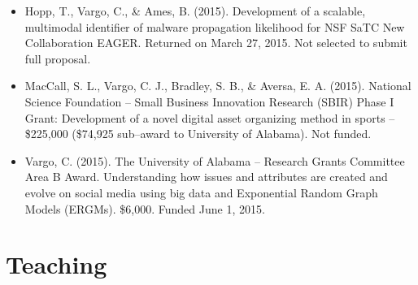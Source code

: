 \documentclass[11pt,letterpaper]{article}
\begin{document}
{\begin{itemize}
\item Hopp, T., Vargo, C., \& Ames, B. (2015). Development of a scalable, multimodal identifier of malware propagation likelihood for NSF SaTC New Collaboration EAGER. Returned on March 27, 2015. Not selected to submit full proposal.
\item MacCall, S. L., Vargo, C. J., Bradley, S. B., \& Aversa, E. A. (2015). National Science Foundation -- Small Business Innovation Research (SBIR) Phase I Grant: Development of a novel digital asset organizing method in sports -- \$225,000 (\$74,925 sub--award to University of Alabama). Not funded.
\item Vargo, C. (2015). The University of Alabama -- Research Grants Committee Area B Award. Understanding how issues and attributes are created and evolve on social media using big data and Exponential Random Graph Models (ERGMs). \$6,000. Funded June 1, 2015.
\end{itemize}
}
\section{Teaching}
\end{document}
